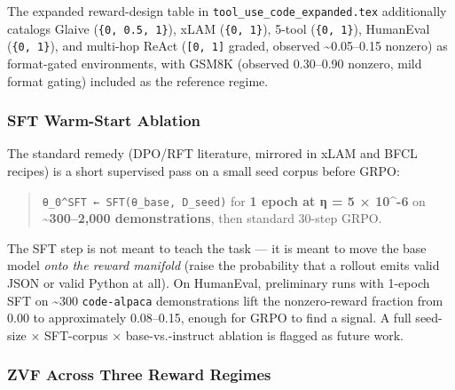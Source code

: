 \documentclass[
  american,
  11pt,
  a4paper,
  oneside]{report}
\begin{document}
The expanded reward-design table in
\texttt{tool\_use\_code\_expanded.tex} additionally catalogs Glaive
(\texttt{\{0,\ 0.5,\ 1\}}), xLAM (\texttt{\{0,\ 1\}}), 5-tool
(\texttt{\{0,\ 1\}}), HumanEval (\texttt{\{0,\ 1\}}), and multi-hop
ReAct (\texttt{{[}0,\ 1{]}} graded, observed \textasciitilde0.05--0.15
nonzero) as format-gated environments, with GSM8K (observed 0.30--0.90
nonzero, mild format gating) included as the reference regime.

\subsubsection{SFT Warm-Start Ablation}\label{sft-warm-start-ablation}

The standard remedy (DPO/RFT literature, mirrored in xLAM and BFCL
recipes) is a short supervised pass on a small seed corpus before GRPO:

\begin{quote}
\texttt{θ\_0\^{}SFT\ ←\ SFT(θ\_base,\ D\_seed)} for \textbf{1 epoch at η
= 5 × 10\^{}-6} on \textbf{\textasciitilde300--2,000 demonstrations},
then standard 30-step GRPO.
\end{quote}

The SFT step is not meant to teach the task --- it is meant to move the
base model \emph{onto the reward manifold} (raise the probability that a
rollout emits valid JSON or valid Python at all). On HumanEval,
preliminary runs with 1-epoch SFT on \textasciitilde300
\texttt{code-alpaca} demonstrations lift the nonzero-reward fraction
from 0.00 to approximately 0.08--0.15, enough for GRPO to find a signal.
A full seed-size × SFT-corpus × base-vs.-instruct ablation is flagged as
future work.

\subsubsection{ZVF Across Three Reward
Regimes}\label{zvf-across-three-reward-regimes}
\end{document}
